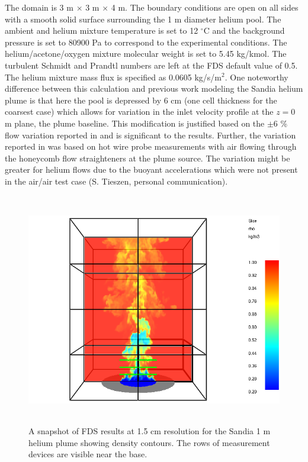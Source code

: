 The domain is 3 m $\times$ 3 m $\times$ 4 m. The boundary conditions are open on all sides with a smooth solid surface surrounding the 1 m diameter helium pool.  The ambient and helium mixture temperature is set to 12 $^\circ$C and the background pressure is set to 80900 Pa to correspond to the experimental conditions.  The helium/acetone/oxygen mixture molecular weight is set to 5.45 kg/kmol.  The turbulent Schmidt and Prandtl numbers are left at the FDS default value of 0.5.  The helium mixture mass flux is specified as 0.0605 kg/s/m$^2$.  One noteworthy difference between this calculation and previous work modeling the Sandia helium plume \cite{DesJardin:2004} is that here the pool is depressed by 6 cm (one cell thickness for the coarsest case) which allows for variation in the inlet velocity profile at the $z=0$ m plane, the plume baseline.  This modification is justified based on the $\pm 6$ \% flow variation reported in \cite{Blanchat:2001} and is significant to the results.  Further, the variation reported in \cite{Blanchat:2001} was based on hot wire probe measurements with air flowing through the honeycomb flow straighteners at the plume source.  The variation might be greater for helium flows due to the buoyant accelerations which were not present in the air/air test case (S. Tieszen, personal communication).

\begin{figure}[h]
\begin{center}
\includegraphics[height=4in]{FIGURES/Sandia_Plumes/Sandia_He_1m_image}
\caption[Sandia 1~m helium plume image.]{A snapshot of FDS results at 1.5 cm resolution for the Sandia 1 m helium plume showing density contours.  The rows of measurement devices are visible near the base.}
\label{Sandia_He_1m_image}
\end{center}
\end{figure}

